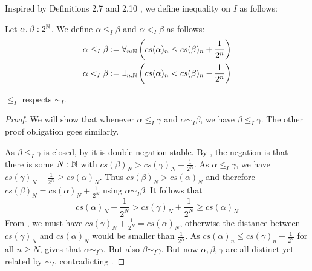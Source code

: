 Inspired by Definitions 2.7 and 2.10 \Cite{Bishop}, 
we define inequality on $I$ as follows:
\begin{definition}
  Let $\alpha,\beta:2^{\mathbb{N}}$. 
  We define $\alpha\leq_I \beta$ and $\alpha<_I\beta$ as follows:
  \begin{align}
  \alpha\leq_I\beta : = \forall_{n:\mathbb{N}} \left( cs(\alpha)_n \leq cs(\beta)_n + \frac {1} {2^n}\right)\\ 
    \alpha   <_I \beta : = \exists_{n:\mathbb{N}} \left( cs(\alpha)_n < cs(\beta)_n - \frac {1} {2^n}\right)
\end{align}
\end{definition}
\begin{lemma}
  $\leq_I$ respects $\sim_I$. 
\end{lemma}
\begin{proof}
  We will show that whenever $\alpha\leq_I \gamma$ and $\alpha\sim_I\beta$, we have $\beta\leq_I\gamma$. 
  The other proof obligation goes similarly. 


  As $\beta\leq_I\gamma$ is closed, by  it is double negation stable. 
  By , the negation is that there is some 
  $N:\mathbb{N}$ with 
  $cs(\beta)_N > cs(\gamma)_N + \frac{1}{2^N}.$
  As $\alpha\leq_I\gamma$, we have 
  $cs(\gamma)_N + \frac{1}{2^N}\geq cs(\alpha)_N $. 
  Thus $cs(\beta)_N > cs(\alpha)_N$ and therefore $cs(\beta)_N = cs(\alpha)_N+\frac{1}{2^N}$ using  $\alpha\sim_I\beta$.
  It follows that 
  $$
  cs(\alpha)_N+\frac{1}{2^N} > cs(\gamma)_N + \frac{1}{2^N} \geq cs(\alpha)_N
  $$
  From , we must have
  $cs(\gamma)_N  + \frac{1}{2^N} = cs(\alpha)_N$, otherwise the distance 
  between $cs(\gamma)_N$ and $cs(\alpha)_N$ 
  would be smaller than $\frac{1}{2^N}$.
  As $cs(\alpha)_n \leq cs(\gamma)_n + \frac{1}{2^n}$ for all $n\geq N$, 
   gives that 
  $\alpha\sim_I\gamma$. But also $\beta\sim_I\gamma$. 
  But now $\alpha,\beta,\gamma$ are all distinct yet related by $\sim_I$, contradicting 
  . 
\end{proof}

